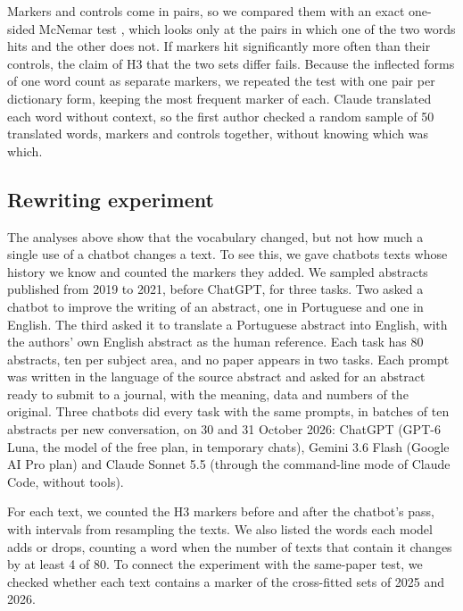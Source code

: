 \documentclass[12pt]{article}
\begin{document}
Markers and controls come in pairs, so we compared them with an exact one-sided McNemar test
\cite{mcnemar1947note}, which looks only at the pairs in which one of the two words hits and the
other does not. If markers hit significantly more often than their controls, the claim of H3 that
the two sets differ fails. Because the inflected forms of one word count as separate markers, we
repeated the test with one pair per dictionary form, keeping the most frequent marker of each.
Claude translated each word without context, so the first author checked a random sample of 50
translated words, markers and controls together, without knowing which was which.

\subsection{Rewriting experiment}
\label{sec:experiment-method}

The analyses above show that the vocabulary changed, but not how much a single use of a chatbot
changes a text. To see this, we gave chatbots texts whose history we know and counted the markers
they added. We sampled abstracts published from 2019 to 2021, before ChatGPT, for three tasks. Two
asked a chatbot to improve the writing of an abstract, one in Portuguese and one in English. The
third asked it to translate a Portuguese abstract into English, with the authors' own English
abstract as the human reference. Each task has 80 abstracts, ten per subject area, and no paper
appears in two tasks. Each prompt was written in the language of the source abstract and asked for
an abstract ready to submit to a journal, with the meaning, data and numbers of the original. Three
chatbots did every task with the same prompts, in batches of ten abstracts per new conversation, on
30 and 31 October 2026: ChatGPT (GPT-6 Luna, the model of the free plan, in temporary chats),
Gemini 3.6 Flash (Google AI Pro plan) and Claude Sonnet 5.5 (through the command-line mode of
Claude Code, without tools).

For each text, we counted the H3 markers before and after the chatbot's pass, with intervals from
resampling the texts. We also listed the words each model adds or drops, counting a word when the
number of texts that contain it changes by at least 4 of 80. To connect the experiment with the
same-paper test, we checked whether each text contains a marker of the cross-fitted sets of 2025
and 2026.

\end{document}
